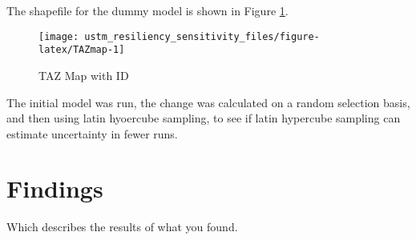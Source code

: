 \documentclass[3p, authoryear, review]{elsarticle} %
\begin{document}
The shapefile for the dummy model is shown in Figure \ref{fig:TAZmap}.

\begin{figure}

{\centering \texttt{[image: ustm\_resiliency\_sensitivity\_files/figure-latex/TAZmap-1]} 

}

\caption{TAZ Map with ID}\label{fig:TAZmap}
\end{figure}

The initial model was run, the change was calculated on a random selection basis, and then using latin hyoercube sampling, to see if latin hypercube sampling can estimate uncertainty in fewer runs.

\hypertarget{findings}{%
\section{Findings}\label{findings}}

Which describes the results of what you found.


\end{document}
